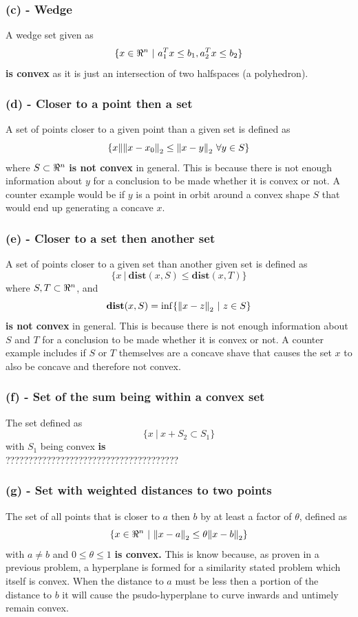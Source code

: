 \documentclass[letter]{article}
\begin{document}
\subsubsection{(c) - Wedge}
A wedge set given as $$\{x \in \real^n \ | \ a_1^T x \leq b_1, a_2^T x \leq b_2\}$$ \textbf{is convex} as it is just an intersection of two halfspaces (a polyhedron).

\subsubsection{(d) - Closer to a point then a set}
A set of points closer to a given point than a given set is defined as $$\{x \| \norm{x-x_0}_2 \leq \norm{x - y}_2 \ \forall y \in S\}$$ where $S\subset\real^n$ \textbf{is not convex} in general. This is because there is not enough information about $y$ for a conclusion to be made whether it is convex or not. A counter example would be if $y$ is a point in orbit around a convex shape $S$ that would end up generating a concave $x$.

\subsubsection{(e) - Closer to a set then another set}
A set of points closer to a given set than another given set is defined as $$\{x \ | \ \textbf{dist}(x,S) \leq \textbf{dist}(x,T)\}$$ where $S, T \subset\real^n$, and $$\textbf{dist}(x,S) = \inf\{\norm{x-z}_2 \ | \ z \in S\}$$ \textbf{is not convex} in general. This is because there is not enough information about $S$ and $T$ for a conclusion to be made whether it is convex or not. A counter example includes if $S$ or $T$ themselves are a concave shave that causes the set $x$ to also be concave and therefore not convex.


\subsubsection{(f) - Set of the sum being within a convex set}
The set defined as $$\{x \ | \ x + S_2 \subset S_1\}$$ with $S_1$ being convex \textbf{is }\\

??????????????????????????????????????\\

\subsubsection{(g) - Set with weighted distances to two points}
The set of all points that is closer to $a$ then $b$ by at least a factor of $\theta$, defined as $$\{x \in \real^n \ | \ \norm{x-a}_2 \leq \theta \norm{x-b}_2\}$$ with $a \neq b$ and $0 \leq \theta \leq 1$ \textbf{is convex.} This is know because, as proven in a previous problem, a hyperplane is formed for a similarity stated problem which itself is convex. When the distance to $a$ must be less then a portion of the distance to $b$ it will cause the psudo-hyperplane to curve inwards and untimely remain convex.
\end{document}
